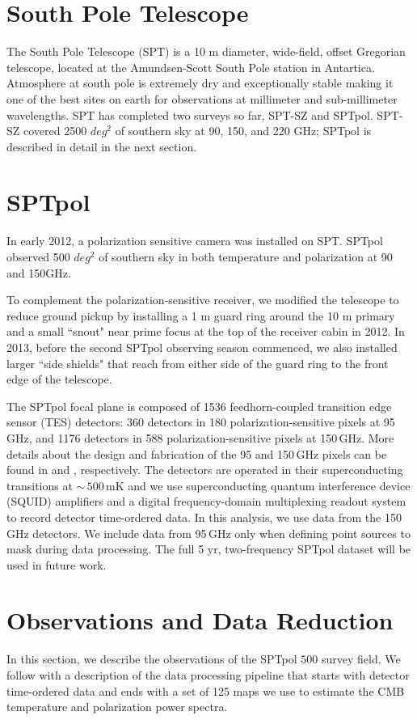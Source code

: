 \documentclass[usenatbib, twocolumn, nofootinbib, reprint, emulateapj, amsart]{revtex4-1}
\begin{document}
\section{South Pole Telescope}
The South Pole Telescope (SPT) is a 10 m diameter, wide-field, offset Gregorian telescope, located at the Amundsen-Scott South Pole station in Antartica. 
Atmosphere at south pole is extremely dry and exceptionally stable making it one of the best sites on earth for observations at millimeter and sub-millimeter wavelengths.
SPT has completed two surveys so far, SPT-SZ and SPTpol. 
SPT-SZ  covered 2500 $deg^{2}$ of southern sky at 90, 150, and 220 GHz; SPTpol is described in detail in the next section.


\section{SPT\lowercase{pol}}
In early 2012, a polarization sensitive camera was installed on SPT.
SPTpol observed 500 $deg^{2}$ of southern sky in both temperature and polarization at 90 and 150GHz. 


To complement the polarization-sensitive receiver, we modified the telescope to reduce ground pickup by installing a 1 m guard ring around the 10 m primary and a small ``snout" near prime focus at the top of the receiver cabin in 2012.
In 2013, before the second SPTpol observing season commenced, we also installed larger ``side shields" that reach from either side of the guard ring to the front edge of the telescope.

The SPTpol focal plane is composed of 1536 feedhorn-coupled transition edge sensor (TES) detectors:
360 detectors in 180 polarization-sensitive pixels at 95\,GHz, and 1176 detectors in 588 polarization-sensitive pixels at 150\,GHz.
More details about the design and fabrication of the 95 and 150\,GHz pixels can be found in \cite{sayre12} and \cite{henning12}, respectively.
The detectors are operated in their superconducting transitions at $\sim\,500$\,mK and we use superconducting quantum interference device (SQUID) amplifiers and a digital frequency-domain multiplexing readout system \citep{dobbs12b, dehaan12} to record detector time-ordered data.
In this analysis, we use data from the 150\,GHz detectors.
We include data from 95\,GHz only when defining point sources to mask during data processing.
The full 5 yr, two-frequency SPTpol dataset will be used in future work.

\section{Observations and Data Reduction}
In this section, we describe the observations of the SPTpol $500$ survey field.
We follow with a description of the data processing pipeline that starts with detector time-ordered data and ends with a set of 125 maps we use to estimate the CMB temperature and polarization power spectra.
\end{document}
